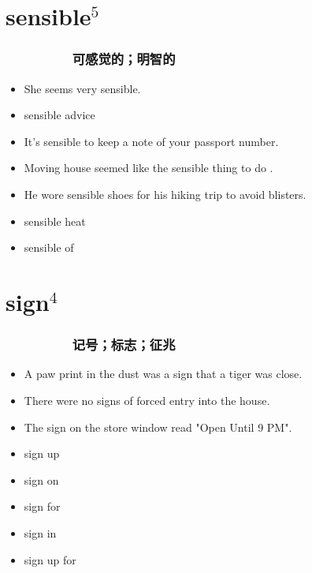 \documentclass[UTF8,4pt,a3paper,space]{article}
\begin{document}
\begin{multicols}{4}
\section{sensible$^5$}
\subsubsection*{\ \ \ \ \ \ \ \ \ 可感觉的；明智的}\begin{itemize}
\itemsep-0.5em
    \item She seems very sensible.    \item sensible advice    \item It’s sensible to keep a note of your passport number.    \item Moving house seemed like the sensible thing to do .    \item  He wore sensible shoes for his hiking trip to avoid blisters. 
\end{itemize}
\begin{itemize}
\itemsep-0.5em
   \item sensible heat   \item sensible of\end{itemize}
\hrulefill


\section{sign$^4$}
\subsubsection*{\ \ \ \ \ \ \ \ \ 记号；标志；征兆}\begin{itemize}
\itemsep-0.5em
    \item A paw print in the dust was a sign that a tiger was close.    \item There were no signs of forced entry into the house.    \item The sign on the store window read "Open Until 9 PM". 
\end{itemize}
\begin{itemize}
\itemsep-0.5em
   \item sign up   \item sign on   \item sign for   \item sign in   \item sign up for\end{itemize}
\hrulefill




\end{multicols}
\end{document}
